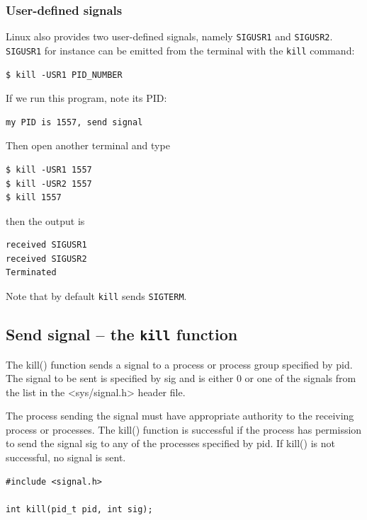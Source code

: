 \documentclass[a4paper]{article}
\begin{document}
\subsubsection{User-defined signals}

Linux also provides two user-defined signals, namely \texttt{SIGUSR1} and \texttt{SIGUSR2}. \texttt{SIGUSR1} for instance can be emitted from the terminal with the \texttt{kill} command:
\begin{verbatim}
$ kill -USR1 PID_NUMBER
\end{verbatim}
If we run this program, note its PID:
\begin{verbatim}
my PID is 1557, send signal
\end{verbatim}
Then open another terminal and type
\begin{verbatim}
$ kill -USR1 1557
$ kill -USR2 1557
$ kill 1557
\end{verbatim}
then the output is
\begin{verbatim}
received SIGUSR1
received SIGUSR2
Terminated
\end{verbatim}
Note that by default \texttt{kill} sends \texttt{SIGTERM}.




\subsection{Send signal -- the \texttt{kill} function}




The kill() function sends a signal to a process or process group specified by pid. The signal to be sent is specified by sig and is either 0 or one of the signals from the list in the <sys/signal.h> header file.

The process sending the signal must have appropriate authority to the receiving process or processes. The kill() function is successful if the process has permission to send the signal sig to any of the processes specified by pid. If kill() is not successful, no signal is sent.
\begin{verbatim}
#include <signal.h>

int kill(pid_t pid, int sig);
\end{verbatim}
\end{document}
